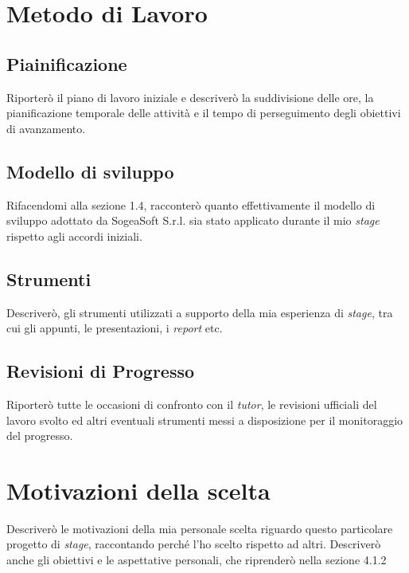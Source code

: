     \section{Metodo di Lavoro}
        \subsection{Piainificazione}
        Riporterò il piano di lavoro iniziale e descriverò la suddivisione delle ore, la pianificazione temporale delle attività e il tempo di perseguimento degli obiettivi di avanzamento. 
        \subsection{Modello di sviluppo}
        Rifacendomi alla sezione 1.4, racconterò quanto effettivamente il modello di sviluppo adottato da SogeaSoft S.r.l. sia stato applicato durante il mio \textit{stage} rispetto agli accordi iniziali. 
        \subsection{Strumenti}
        Descriverò, gli strumenti utilizzati a supporto della mia esperienza di \textit{stage}, tra cui gli appunti, le presentazioni, i \textit{report} etc. 
        \subsection{Revisioni di Progresso}
        Riporterò tutte le occasioni di confronto con il \textit{tutor}, le revisioni ufficiali del lavoro svolto ed altri eventuali strumenti messi a disposizione per il monitoraggio del progresso. 
    \section{Motivazioni della scelta}
    Descriverò le motivazioni della mia personale scelta riguardo questo particolare progetto di \textit{stage}, raccontando perché l'ho scelto rispetto ad altri. Descriverò anche gli obiettivi e le aspettative personali, che riprenderò nella sezione 4.1.2
    
        
